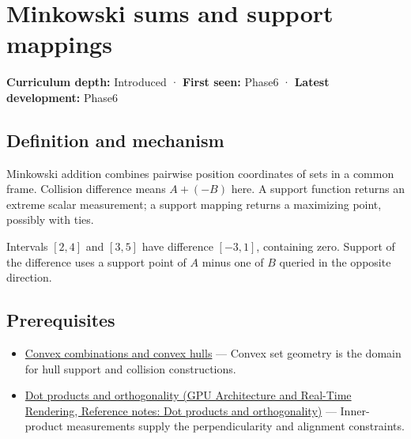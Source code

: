 \hypertarget{appendix-215ac7099a82}{}\label{referencestart:appendix-215ac7099a82}
\section{Minkowski sums and support mappings}\label{appendix-215ac7099a82-minkowski-sums-and-support-mappings}

\hypertarget{appendix-215ac7099a82-minkowski-sums-and-support-mappings}{}

\textbf{Curriculum depth:} Introduced · \textbf{First seen:} Phase6 · \textbf{Latest development:} Phase6

\begin{allmightroledefinition}

\subsection{Definition and mechanism}\label{appendix-215ac7099a82-definition-and-mechanism}

\hypertarget{appendix-215ac7099a82-definition-and-mechanism}{}

Minkowski addition combines pairwise position coordinates of sets in a common frame. Collision difference means \(A+(-B)\) here. A support function returns an extreme scalar measurement; a support mapping returns a maximizing point, possibly with ties.

\end{allmightroledefinition}

Intervals \([2,4]\) and \([3,5]\) have difference \([-3,1]\), containing zero. Support of the difference uses a support point of \(A\) minus one of \(B\) queried in the opposite direction.

\subsection{Prerequisites}\label{appendix-215ac7099a82-prerequisites}

\hypertarget{appendix-215ac7099a82-prerequisites}{}

\begin{itemize}
\tightlist
\item
  \hyperref[appendix-0026ec42c9d5]{Convex combinations and convex hulls} --- Convex set geometry is the domain for hull support and collision constructions.
\item
  \href{../06-GPU-Architecture-and-Real-Time-Rendering/main.pdf\#nameddest=appendix-8bc4e8fc547c}{Dot products and orthogonality (GPU Architecture and Real-Time Rendering, Reference notes: Dot products and orthogonality)} --- Inner-product measurements supply the perpendicularity and alignment constraints.
\end{itemize}

